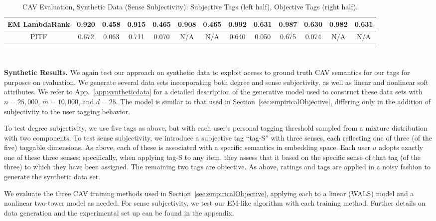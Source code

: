 \documentclass[manuscript,screen,nonacm]{acmart}
\newcommand{\1}{{\mathbf 1}}
\theoremstyle{TheoremNum}
\begin{document}
\begin{table}[t]
{\begin{tabular}{|c||c|c|c|c|c|c||c|c|c|c|c|c|}
 EM LambdaRank & 0.920 & 0.458 & \textbf{0.915} & 0.465 & \textbf{0.908} & 0.465 & \textbf{0.992} & 0.631 & \textbf{0.987} & 0.630 & \textbf{0.982} & 0.631 \\ \hline
 PITF & 0.672 & 0.063 & 0.711 & 0.070 & N/A & N/A & 0.640 & 0.050 & 0.675 & 0.074 & N/A & N/A \\ \hline
 \end{tabular}
  } \\
  \vspace*{2mm}
   \caption{CAV Evaluation, Synthetic Data (Sense Subjectivity): Subjective Tags (left half), Objective Tags (right half).}
  \label{tab:subjectivity_sense}
     \vspace{-0.2in}
\end{table}


\vskip 2mm
\noindent
\textbf{Synthetic Results.} \hspace*{2mm}
We again test our approach on synthetic data to exploit access to ground truth CAV semantics for our tags for purposes on evaluation.
We generate several data sets incorporating both degree and sense subjectivity, as well as linear and nonlinear soft attributes.
We refer to App.~\ref{app:syntheticdata} for a detailed description of the generative model used to construct these data sets with $n = 25,000$, $m = 10,000$, and $d=25$.
The model is similar to that used in Section~\ref{sec:empiricalObjective}, differing only in the addition of subjectivity to the user tagging behavior.

To test degree subjectivity, we use five tags as above, but with each user's personal tagging threshold sampled from a mixture distribution with two components.
To test sense subjectivity, we introduce a subjective tag ``tag-S'' with three senses,
each reflecting one of three (of the five) taggable dimensions. As above, each of these is associated with a specific semantics in embedding space. Each user $u$ adopts exactly one of these three senses; specifically, when applying tag-S to any item, they assess that it based on the specific sense of that tag (of the three) to which they have been assigned. The remaining two tags are objective. As above, ratings and tags are applied in a noisy fashion to generate the synthetic data set.

We evaluate the three CAV training methods used in Section~\ref{sec:empiricalObjective}, applying each to a linear (WALS) model and a nonlinear two-tower model as needed.
For sense subjectivity, we test our EM-like algorithm with each training method. Further details on data generation and the experimental set up can be found in the appendix.
\end{document}
